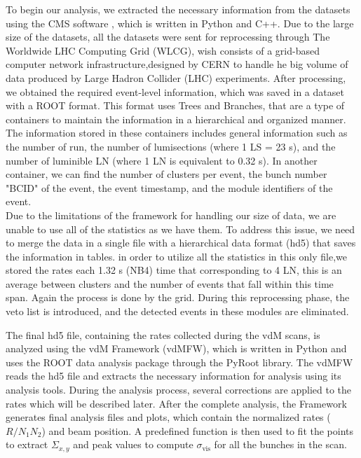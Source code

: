 To begin our analysis, we extracted the necessary information from the datasets using the CMS software , which is written in Python and C++. Due to the large size of the datasets, all the datasets were sent for reprocessing through The Worldwide LHC Computing Grid (WLCG), wish consists of a grid-based computer network infrastructure,designed by CERN to handle he big volume of data produced by Large Hadron Collider (LHC) experiments.
After processing, we obtained the required event-level information, which was saved in a dataset with a ROOT format. This format uses Trees and Branches, that are a type of  containers to maintain the information in a hierarchical and organized manner. The information stored in these containers includes general information such as the number of run, the number of lumisections (where 1 LS = 23 s), and the number of luminible LN (where 1 LN is equivalent to 0.32 s). In another container, we can find the number of clusters per event, the bunch number "BCID" of the event, the event timestamp, and the module identifiers of the event. \\
  
Due to the limitations of the framework for handling our size of data, we are unable to use all of the statistics as we have them. To address this issue, we need to merge the data in a single file with a hierarchical data format (hd5) that saves the information in tables. in order  to utilize all the statistics in this only file,we stored  the rates each 1.32 s (NB4) time that corresponding to 4 LN, this is an average  between clusters and the number of events that fall within this time span. Again the process is done by the grid. During this reprocessing phase, the veto list is introduced, and the detected events in these modules are eliminated.

The final hd5 file, containing the rates collected during the vdM scans, is analyzed using the vdM Framework (vdMFW), which is written in Python and uses the ROOT data analysis package through the PyRoot library. The vdMFW reads the hd5 file and extracts the necessary information for analysis using its analysis tools. During the analysis process, several corrections are applied to the rates which will be described later.
After the complete analysis, the Framework generates final analysis files and plots, which contain the normalized rates ($R/N_{1}N_{2}$) and beam position.  A predefined function is then used to fit the points to extract $\Sigma_{x,y}$ and peak values to compute $\sigma_{\text{vis}}$ for all the bunches in the scan.

